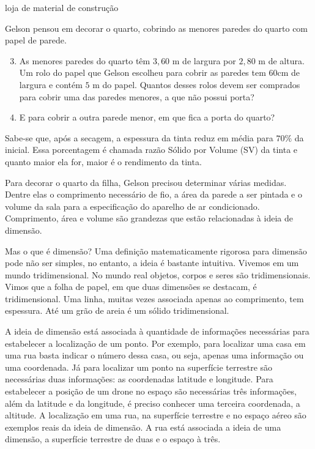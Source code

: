 \begin{task}{loja de material de construção}
\begin{enumerate}
\end{enumerate}

Gelson pensou em decorar o quarto, cobrindo as menores paredes do quarto com papel de parede.
\begin{enumerate}
\setcounter{enumi}{2}
\item {} 
As menores paredes do quarto têm $3{,}60$ m de largura por $2{,}80$ m de altura. Um rolo do papel  que Gelson escolheu para cobrir as paredes tem 60cm de largura e contém $5$ m do papel. Quantos desses rolos devem ser comprados para cobrir uma das paredes menores, a que não possui porta?

\item {} 
E para cobrir a outra parede menor, em que  fica a porta do quarto?

\end{enumerate}
\end{task}

\begin{observation}{}

Sabe-se que, após a secagem, a espessura da tinta reduz em média para $70\%$ da inicial. Essa porcentagem é chamada razão Sólido por Volume (SV) da tinta e quanto maior ela for, maior é o rendimento da tinta.
\end{observation}


\label{\detokenize{GE504-3:organizando-as-ideias-dimensao}}\label{\detokenize{GE504-3::doc}}
Para decorar o quarto da filha, Gelson precisou determinar várias medidas. Dentre elas o comprimento necessário de fio, a área da parede a ser pintada e o volume da sala para a especificação do aparelho de ar condicionado. Comprimento, área e volume são grandezas que estão relacionadas à ideia de dimensão.

Mas o que é dimensão? Uma definição matematicamente rigorosa para dimensão pode não ser simples, no entanto, a ideia é bastante intuitiva. Vivemos em um mundo tridimensional. No mundo real objetos, corpos e seres são tridimensionais. Vimos que a folha de papel, em que duas dimensões se destacam, é tridimensional. Uma linha, muitas vezes associada apenas ao comprimento, tem espessura. Até um grão de areia é um sólido tridimensional.

A ideia de dimensão está associada à quantidade de informações necessárias para estabelecer a localização de um ponto. Por exemplo, para localizar uma casa em uma rua basta indicar o número dessa casa, ou seja, apenas uma informação ou uma coordenada. Já para localizar um ponto na superfície terrestre são necessárias duas informações: as coordenadas latitude e longitude. Para estabelecer a posição de um drone no espaço são necessárias três informações, além da latitude e da longitude, é preciso conhecer uma terceira coordenada, a altitude. A localização em uma rua, na superfície terrestre e no espaço aéreo são exemplos reais da ideia de dimensão. A rua está associada a ideia de uma dimensão, a superfície terrestre de duas e o espaço à três.


